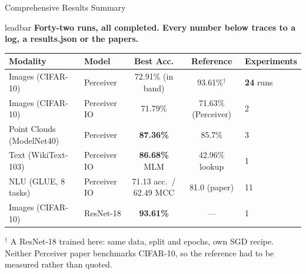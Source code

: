 \documentclass[aspectratio=169,11pt]{beamer}
\newcommand{\lead}[1]{%
  \begin{beamercolorbox}[wd=\textwidth,sep=5pt,center]{leadbar}%
    \small\bfseries #1%
  \end{beamercolorbox}\vspace{0.6em}}
\begin{document}
\begin{frame}[shrink=28]{Comprehensive Results Summary}
  \lead{Forty-two runs, all completed. Every number below traces to a log, a results.json or the papers.}
  \begin{table}
    \centering\small
    \begin{tabular}{llccl}
      \toprule
      \textbf{Modality} & \textbf{Model} & \textbf{Best Acc.} & \textbf{Reference} & \textbf{Experiments} \\
      \midrule
      Images (CIFAR-10) & Perceiver & 72.91\% (in band) & 93.61\%$^{\dagger}$ & \textbf{24} runs \\
      Images (CIFAR-10) & Perceiver IO & 71.79\% & 71.63\% (Perceiver) & 2 \\
      Point Clouds (ModelNet40) & Perceiver & \textbf{87.36\%} & 85.7\% & 3 \\
      Text (WikiText-103) & Perceiver IO & \textbf{86.68\%} MLM & 42.96\% lookup & 1 \\
      NLU (GLUE, 8 tasks) & Perceiver IO & 71.13 acc.\ / 62.49 MCC & 81.0 (paper) & 11 \\
      Images (CIFAR-10) & ResNet-18 & \textbf{93.61\%} & --- & 1 \\
      \bottomrule
    \end{tabular}
  \end{table}

  {\scriptsize $^{\dagger}$ A ResNet-18 trained here: same data, split and epochs, own SGD recipe. Neither Perceiver paper benchmarks CIFAR-10, so the reference had to be measured rather than quoted.}


\end{frame}
\end{document}
